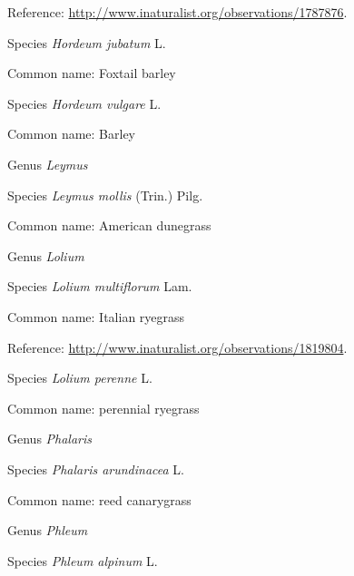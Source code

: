 \documentclass[9pt, article]{memoir}
\begin{document}
\begin{multicols}{2}
Reference: 
\url{http://www.inaturalist.org/observations/1787876}.

\vspace{6pt}\noindent\hspace{36pt}Species \textit{Hordeum jubatum} L.


Common name: Foxtail barley

\vspace{6pt}\noindent\hspace{36pt}Species \textit{Hordeum vulgare} L.


Common name: Barley

\vspace{6pt}\noindent\hspace{30pt}Genus \textit{Leymus}


\vspace{6pt}\noindent\hspace{36pt}Species \textit{Leymus mollis} (Trin.) Pilg.


Common name: American dunegrass

\vspace{6pt}\noindent\hspace{30pt}Genus \textit{Lolium}


\vspace{6pt}\noindent\hspace{36pt}Species \textit{Lolium multiflorum} Lam.


Common name: Italian ryegrass

Reference: 
\url{http://www.inaturalist.org/observations/1819804}.

\vspace{6pt}\noindent\hspace{36pt}Species \textit{Lolium perenne} L.


Common name: perennial ryegrass

\vspace{6pt}\noindent\hspace{30pt}Genus \textit{Phalaris}


\vspace{6pt}\noindent\hspace{36pt}Species \textit{Phalaris arundinacea} L.


Common name: reed canarygrass

\vspace{6pt}\noindent\hspace{30pt}Genus \textit{Phleum}


\vspace{6pt}\noindent\hspace{36pt}Species \textit{Phleum alpinum} L.



\end{multicols}
\end{document}
